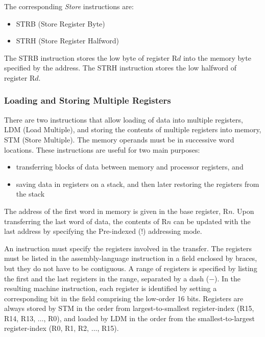 \documentclass[11pt, twoside, pdftex]{article}
\begin{document}
The corresponding {\it Store} instructions are: 
\begin{itemize}
\item STRB (Store Register Byte)
\item STRH (Store Register Halfword)
\end{itemize}
\noindent
The STRB instruction stores the low byte of register R$d$ into
the memory byte specified by the address. The STRH instruction
stores the low halfword of register R$d$. 

\subsubsection{Loading and Storing Multiple Registers}
\label{sec:multi}
There are two instructions that allow loading of data into
multiple registers, LDM (Load Multiple), and storing the contents
of multiple registers into memory, STM (Store Multiple).
The memory operands must be in successive word locations.
These instructions are useful for two main purposes:
\begin{itemize}
\item transferring blocks of data between memory and processor
registers, and
\item saving data in registers on a stack, and then later restoring the registers from the stack
\end{itemize}
\noindent
The address of the first word in memory is given in the base
register, R$n$. Upon transferring the last word of data, the
contents of R$n$ can be updated with the last address by
specifying the Pre-indexed (!) addressing mode.

An instruction must specify the registers involved in the
transfer. The registers must be listed in the assembly-language instruction
in a field enclosed by braces, but they
do not have to be contiguous. A range of registers is specified
by listing the first and the last registers in the range,
separated by a dash ($-$). In the resulting machine instruction,
each register is identified by setting a corresponding bit in
the field comprising the low-order 16 bits. Registers are always stored by STM in the order from
largest-to-smallest register-index (R15, R14, R13, $\ldots$, R0), and loaded by LDM in the 
order from the smallest-to-largest register-index (R0, R1, R2, $\ldots$, R15).
\end{document}
